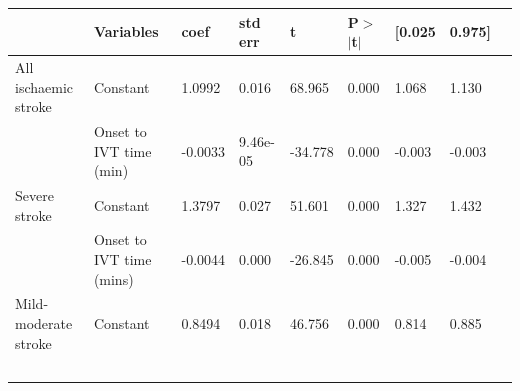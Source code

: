 \begin{table}[!ht]
    \centering
        \begin{tabular}{lllllllll}
        \toprule
         & Variables & coef & std err & t & P$>$$|$t$|$ & [0.025 & 0.975] \\ 
         \midrule
        All ischaemic stroke & Constant & 1.0992 & 0.016 & 68.965 & 0.000 & 1.068 & 1.130\\
        & Onset to IVT time (min) &  -0.0033  & 9.46e-05 & -34.778 & 0.000 & -0.003 & -0.003\\   
        \midrule
        Severe stroke & Constant & 1.3797  & 0.027  & 51.601 & 0.000 & 1.327 & 1.432\\
        & Onset to IVT time (mins) & -0.0044 &  0.000  & -26.845 & 0.000 & -0.005 & -0.004\\ 
        \midrule
        Mild-moderate stroke & Constant &           0.8494 & 0.018   & 46.756 & 0.000 & 0.814 & 0.885\\
$$
\end{tabular}
\end{table}
